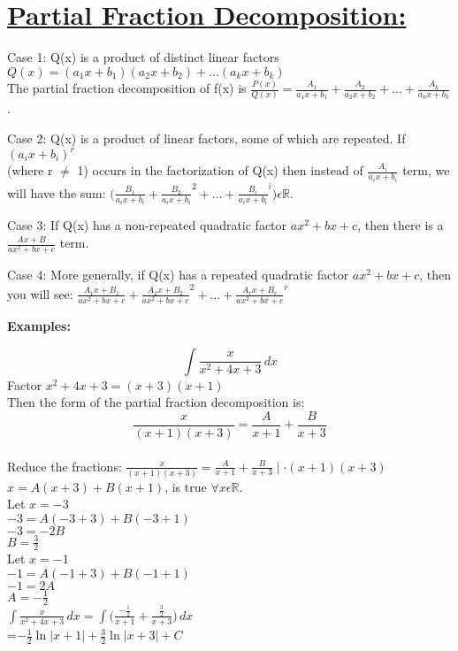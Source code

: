 \documentclass[12pt, letterpaper]{article}
\begin{document}
    \section*{\underline{Partial Fraction Decomposition:}}
    \begin{description}
        \item Case 1: Q(x) is a product of distinct linear factors \\ $Q(x)=(a_1x+b_1)(a_2x+b_2)+\dots(a_kx+b_k)$ \\ The partial fraction decomposition of f(x) is $\frac{P(x)}{Q(x)}=\frac{A_1}{a_1x+b_1}+\frac{A_2}{a_2x+b_2}+\dots+\frac{A_k}{a_kx+b_k}$.
        \item Case 2: Q(x) is a product of linear factors, some of which are repeated. If $(a_ix+b_i)^r$ \\ (where r $\neq$ 1) occurs in the factorization of Q(x) then instead of $\frac{A_i}{a_ix+b_i}$ term, we will have the sum: $\big(\frac{B_1}{a_ix+b_i}+\frac{B_2}{a_ix+b_i}^2+\dots+\frac{B_i}{a_ix+b_i}^i\big)\epsilon\mathbb{R}$.
        \item Case 3: If Q(x) has a non-repeated quadratic factor $ax^2+bx+c$, then there is a $\frac{Ax+B}{ax^2+bx+c}$ term. 
        \item Case 4: More generally, if Q(x) has a repeated quadratic factor $ax^2+bx+c$, then you will see: $\frac{A_1x+B_1}{ax^2+bx+c}+\frac{A_2x+B_2}{ax^2+bx+c}^2+\dots+\frac{A_rx+B_r}{ax^2+bx+c}^r$
    \end{description}
    \textnormal{\textbf{Examples:}}
    \begin{flushleft}
        $$\int\frac{x}{x^2+4x+3}\,dx$$
        Factor $x^2+4x+3=(x+3)(x+1)$\\
        Then the form of the partial fraction decomposition is:$$\frac{x}{(x+1)(x+3)}=\frac{A}{x+1}+\frac{B}{x+3}$$\\
        Reduce the fractions: $\frac{x}{(x+1)(x+3)}=\frac{A}{x+1}+\frac{B}{x+3}\mid\cdot(x+1)(x+3)$\\
        $x=A(x+3)+B(x+1)$, is true $\forall x\epsilon\mathbb{R}$. \\
        Let $x=-3$\\
        $-3=A(-3+3)+B(-3+1)$\\
        $-3=-2B$\\
        $B=\frac{3}{2}$\\
        Let $x=-1$ \\
        $-1=A(-1+3)+B(-1+1)$\\
        $-1=2A$\\
        $A=-\frac{1}{2}$\\
        $\int\frac{x}{x^2+4x+3}\,dx=\int\big(\frac{-\frac{1}{2}}{x+1}+\frac{\frac{3}{2}}{x+3}\big)\,dx$\\
        \hspace{66pt}=$-\frac{1}{2}\ln|x+1|+\frac{3}{2}\ln|x+3|+C$\\
    \end{flushleft}
    \newpage
\end{document}
